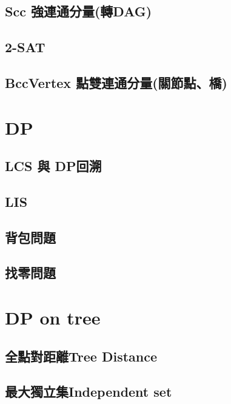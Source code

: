 \subsection{Scc 強連通分量(轉DAG)}


\subsection{2-SAT}


\subsection{BccVertex 點雙連通分量(關節點、橋)}


\section{DP}

\subsection{LCS 與 DP回溯}


\subsection{LIS}


\subsection{背包問題}


\subsection{找零問題}


\section{DP on tree}

\subsection{全點對距離Tree Distance}


\subsection{最大獨立集Independent set}


